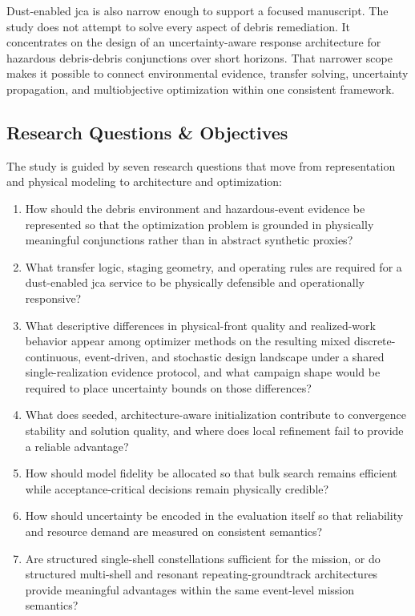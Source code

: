 Dust-enabled \gls{jca} is also narrow enough to support a focused manuscript. The study does not attempt to solve every aspect of debris remediation. It concentrates on the design of an uncertainty-aware response architecture for hazardous debris-debris conjunctions over short horizons. That narrower scope makes it possible to connect environmental evidence, transfer solving, uncertainty propagation, and multiobjective optimization within one consistent framework.

\subsection{Research Questions \& Objectives} \label{ss:research_questions}
The study is guided by seven research questions that move from representation and physical modeling to architecture and optimization:

\begin{enumerate}
  \item \label{rq:debris-repr}
        How should the debris environment and hazardous-event evidence be represented so that the optimization problem is grounded in physically meaningful conjunctions rather than in abstract synthetic proxies?

  \item \label{rq:cost-architecture}
        What transfer logic, staging geometry, and operating rules are required for a dust-enabled \gls{jca} service to be physically defensible and operationally responsive?

  \item \label{rq:ea-selection}
        What descriptive differences in physical-front quality and realized-work behavior appear among optimizer methods on the resulting mixed discrete-continuous, event-driven, and stochastic design landscape under a shared single-realization evidence protocol, and what campaign shape would be required to place uncertainty bounds on those differences?

  \item \label{rq:hybrid-opt}
        What does seeded, architecture-aware initialization contribute to convergence stability and solution quality, and where does local refinement fail to provide a reliable advantage?

  \item \label{rq:efficient-sim}
        How should model fidelity be allocated so that bulk search remains efficient while acceptance-critical decisions remain physically credible?

  \item \label{rq:uncertainty-encoding}
        How should uncertainty be encoded in the evaluation itself so that reliability and resource demand are measured on consistent semantics?

  \item \label{rq:walker-sufficiency}
        Are structured single-shell constellations sufficient for the mission, or do structured multi-shell and resonant repeating-groundtrack architectures provide meaningful advantages within the same event-level mission semantics?
\end{enumerate}

